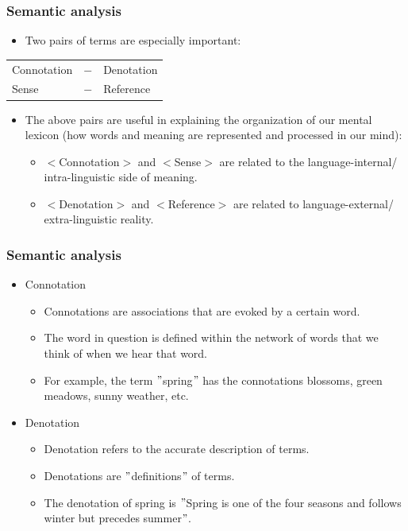 \documentclass[12pt, table]{beamer}
\begin{document}
\begin{frame}
\frametitle{Semantic analysis}
\begin{itemize}
\item Two pairs of terms are especially important:
\end{itemize}
\begin{tabularx}{\linewidth}{YYY}
Connotation & $-$ & Denotation\\
Sense & $-$ & Reference
\end{tabularx}
\begin{itemize}
\item The above pairs are useful in explaining the organization of our mental lexicon (how words and meaning are represented and processed in our mind):
\begin{itemize}
\item $<$Connotation$>$ and $<$Sense$>$ are related to the language-internal/ intra-linguistic side of meaning.
\item $<$Denotation$>$ and $<$Reference$>$ are related to language-external/ extra-linguistic reality.
\end{itemize}
\end{itemize}
\end{frame}

\begin{frame}
\frametitle{Semantic analysis}
\begin{itemize}
\item Connotation	
\begin{itemize}
\item Connotations are associations that are evoked by a certain word. 
\item The word in question is defined within the network of words that we think of when we hear that word.
\item For example, the term $"$spring$"$ has the connotations blossoms, green meadows, sunny weather, etc.	
\end{itemize}
\item Denotation
\begin{itemize}
\item Denotation refers to the accurate description of terms.
\item Denotations are $"$definitions$"$ of terms.
\item The denotation of spring is $"$Spring is one of the four seasons and follows winter but precedes summer$"$. 
\end{itemize}
\end{itemize}
\end{frame}
\end{document}
